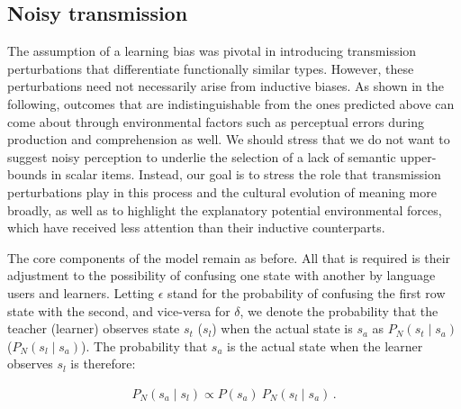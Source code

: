 \documentclass[a4paper]{article}
\begin{document}
\subsection{Noisy transmission}\label{subsec:noise}
The assumption of a learning bias was pivotal in introducing transmission perturbations that differentiate functionally similar types. However, these perturbations need not necessarily arise from inductive biases. As shown in the following, outcomes that are indistinguishable from the ones predicted above can come about through environmental factors such as perceptual errors during production and comprehension as well. We should stress that we do not want to suggest noisy perception to underlie the selection of a lack of semantic upper-bounds in scalar items. Instead, our goal is to stress the role that transmission perturbations play in this process and the cultural evolution of meaning more broadly, as well as to highlight the explanatory potential environmental forces, which have received less attention than their inductive counterparts.

The core components of the model remain as before. All that is required is their adjustment to the possibility of confusing one state with another by language users and learners. Letting $\epsilon$ stand for the probability of confusing the first row state with the second, and vice-versa for $\delta$, we denote the probability that the teacher (learner) observes state $s_t$ ($s_l$) when the actual state is $s_a$ as $P_N(s_t \mid s_a)$ ($P_N(s_l \mid s_a)$). The probability that $s_a$ is the actual state when the learner observes $s_l$ is therefore:

\begin{align*}
  P_N(s_a \mid s_l) \propto P(s_a) \ P_N(s_l \mid s_a)\,.
\end{align*}
\end{document}
